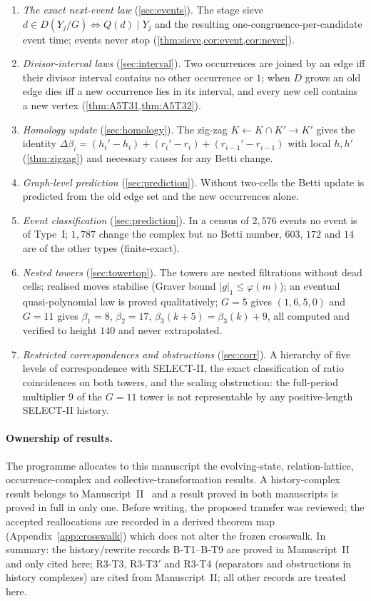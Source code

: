 \begin{enumerate}[leftmargin=2.7em,itemsep=2pt]
\item[\textbf{EIII-7}] \emph{The exact next-event law} (\cref{sec:events}). The stage sieve $d\in D(Y_j/G)\iff Q(d)\mid Y_j$ and the resulting one-congruence-per-candidate event time; events never stop (\cref{thm:sieve,cor:event,cor:never}).
\item[\textbf{EIII-8}] \emph{Divisor-interval laws} (\cref{sec:interval}). Two occurrences are joined by an edge iff their divisor interval contains no other occurrence or $1$; when $D$ grows an old edge dies iff a new occurrence lies in its interval, and every new cell contains a new vertex (\cref{thm:A5T31,thm:A5T32}).
\item[\textbf{EIII-9}] \emph{Homology update} (\cref{sec:homology}). The zig-zag $K\leftarrow K\cap K'\to K'$ gives the identity $\Delta\beta_i=(h_i'-h_i)+(r_i'-r_i)+(r_{i-1}'-r_{i-1})$ with local $h,h'$ (\cref{thm:zigzag}) and necessary causes for any Betti change.
\item[\textbf{EIII-10}] \emph{Graph-level prediction} (\cref{sec:prediction}). Without two-cells the Betti update is predicted from the old edge set and the new occurrences alone.
\item[\textbf{EIII-11}] \emph{Event classification} (\cref{sec:prediction}). In a census of $2{,}576$ events no event is of Type~I; $1{,}787$ change the complex but no Betti number, $603$, $172$ and $14$ are of the other types (finite-exact).
\item[\textbf{EIII-12}] \emph{Nested towers} (\cref{sec:towertop}). The towers are nested filtrations without dead cells; realised moves stabilise (Graver bound $|g|_1\le\varphi(m)$); an eventual quasi-polynomial law is proved qualitatively; $G=5$ gives $(1,6,5,0)$ and $G=11$ gives $\beta_1=8$, $\beta_2=17$, $\beta_3(k+5)=\beta_3(k)+9$, all computed and verified to height $140$ and never extrapolated.
\item[\textbf{EIII-13}] \emph{Restricted correspondences and obstructions} (\cref{sec:corr}). A hierarchy of five levels of correspondence with SELECT-II, the exact classification of ratio coincidences on both towers, and the scaling obstruction: the full-period multiplier $9$ of the $G=11$ tower is not representable by any positive-length SELECT-II history.
\end{enumerate}

\paragraph{Ownership of results.}
The programme allocates to this manuscript the evolving-state, relation-lattice, occurrence-complex and collective-transformation results. A history-complex result belongs to Manuscript~II~\cite{PaperII} and a result proved in both manuscripts is proved in full in only one. Before writing, the proposed transfer was reviewed; the accepted reallocations are recorded in a derived theorem map (Appendix~\ref{app:crosswalk}) which does not alter the frozen crosswalk. In summary: the history/rewrite records B-T1--B-T9 are proved in Manuscript~II and only cited here; R3-T3, R3-T3$'$ and R3-T4 (separators and obstructions in history complexes) are cited from Manuscript~II; all other records are treated here.

